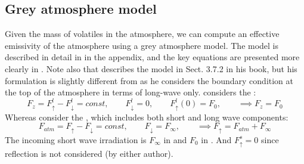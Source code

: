 \subsection{Grey atmosphere model}
Given the mass of volatiles in the atmosphere, we can compute an effective emissivity of the atmosphere using a grey atmosphere model.  The model is described in detail in \cite{AM85} in the appendix, and the key equations are presented more clearly in \cite{ET08}.  Note also that \cite{AND10} describes the model in Sect. 3.7.2 in his book, but his formulation is slightly different from \cite{AM85} as he considers the boundary condition at the top of the atmosphere in terms of long-wave only.  \cite{AND10} considers the :
\begin{equation}
F_z = F_{\uparrow}^l - F_{\downarrow}^l = const, \qquad F_{\downarrow}^l=0, \qquad F_\uparrow^l(0)=F_0, \qquad \implies F_z=F_0
\end{equation}
Whereas \cite{AM85} consider the , which includes both short and long wave components:
\begin{equation}
F_{atm} = F_{\uparrow} - F_{\downarrow} = const, \qquad F_{\downarrow}=F_\infty, \qquad \implies F_{\uparrow} = F_{atm} + F_\infty
\end{equation}
The incoming short wave irradiation is $F_\infty$ in \cite{AM85} and $F_0$ in \cite{AND10}.  And $F_{\uparrow}^s=0$ since reflection is not considered (by either author).

